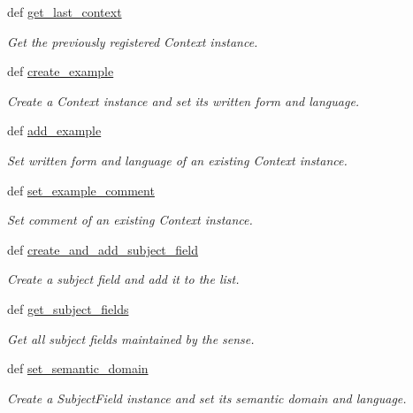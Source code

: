 \begin{DoxyCompactItemize}
def \hyperlink{classlmf_1_1src_1_1core_1_1sense_1_1_sense_af9c1b79eed28bd28279719bdf578d218}{get\+\_\+last\+\_\+context}
\begin{DoxyCompactList}\small\item\em Get the previously registered Context instance. \end{DoxyCompactList}\item 
def \hyperlink{classlmf_1_1src_1_1core_1_1sense_1_1_sense_a61c046aabce91368de9129dd83c2bb20}{create\+\_\+example}
\begin{DoxyCompactList}\small\item\em Create a Context instance and set its written form and language. \end{DoxyCompactList}\item 
def \hyperlink{classlmf_1_1src_1_1core_1_1sense_1_1_sense_ab84c8d7a1cdcce014f99e0c1a1b0aedd}{add\+\_\+example}
\begin{DoxyCompactList}\small\item\em Set written form and language of an existing Context instance. \end{DoxyCompactList}\item 
def \hyperlink{classlmf_1_1src_1_1core_1_1sense_1_1_sense_a9b8d8ea7fe946dd19e2538fe7801754a}{set\+\_\+example\+\_\+comment}
\begin{DoxyCompactList}\small\item\em Set comment of an existing Context instance. \end{DoxyCompactList}\item 
def \hyperlink{classlmf_1_1src_1_1core_1_1sense_1_1_sense_a07d199aca70cf878cb2a71af7a96fa4c}{create\+\_\+and\+\_\+add\+\_\+subject\+\_\+field}
\begin{DoxyCompactList}\small\item\em Create a subject field and add it to the list. \end{DoxyCompactList}\item 
def \hyperlink{classlmf_1_1src_1_1core_1_1sense_1_1_sense_a907267d97926d04d20aaeefe475753d8}{get\+\_\+subject\+\_\+fields}
\begin{DoxyCompactList}\small\item\em Get all subject fields maintained by the sense. \end{DoxyCompactList}\item 
def \hyperlink{classlmf_1_1src_1_1core_1_1sense_1_1_sense_ad46f7e623293409ca06494b5fdeebe52}{set\+\_\+semantic\+\_\+domain}
\begin{DoxyCompactList}\small\item\em Create a Subject\+Field instance and set its semantic domain and language. \end{DoxyCompactList}\item 

\end{DoxyCompactItemize}
